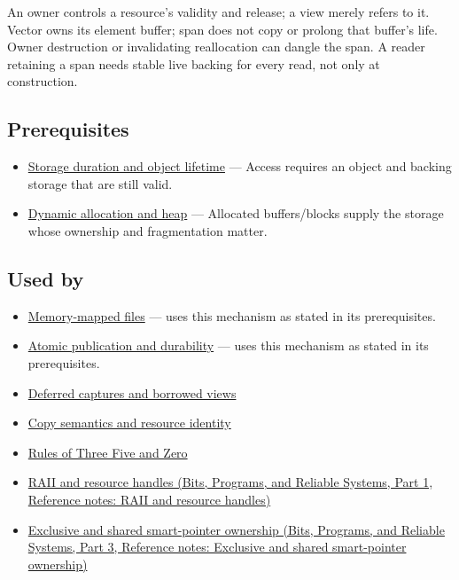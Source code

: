 An owner controls a resource's validity and release; a view merely refers to it. Vector owns its element buffer; span does not copy or prolong that buffer's life. Owner destruction or invalidating reallocation can dangle the span. A reader retaining a span needs stable live backing for every read, not only at construction.

\subsection{Prerequisites}\label{appendix-d52e4486f527-prerequisites}

\hypertarget{appendix-d52e4486f527-prerequisites}{}

\begin{itemize}
\tightlist
\item
  \hyperref[appendix-0b104bcba06b]{Storage duration and object lifetime} --- Access requires an object and backing storage that are still valid.
\item
  \hyperref[appendix-c3480f7d9ff3]{Dynamic allocation and heap} --- Allocated buffers/blocks supply the storage whose ownership and fragmentation matter.
\end{itemize}

\subsection{Used by}\label{appendix-d52e4486f527-used-by}

\hypertarget{appendix-d52e4486f527-used-by}{}

\begin{itemize}
\tightlist
\item
  \hyperref[appendix-313ee7a0ba7b]{Memory-mapped files} --- uses this mechanism as stated in its prerequisites.
\item
  \hyperref[appendix-e89a8f290ef5]{Atomic publication and durability} --- uses this mechanism as stated in its prerequisites.
\item
  \hyperref[appendix-aea529eb5175]{Deferred captures and borrowed views}
\item
  \hyperref[appendix-1340cd1ce582]{Copy semantics and resource identity}
\item
  \hyperref[appendix-7679107d057e]{Rules of Three Five and Zero}
\item
  \href{../01-Bits-Programs-and-Reliable-Systems-P01/main.pdf\#nameddest=appendix-69739d3ab49b}{RAII and resource handles (Bits, Programs, and Reliable Systems, Part 1, Reference notes: RAII and resource handles)}
\item
  \href{../01-Bits-Programs-and-Reliable-Systems-P03/main.pdf\#nameddest=appendix-51602cabe815}{Exclusive and shared smart-pointer ownership (Bits, Programs, and Reliable Systems, Part 3, Reference notes: Exclusive and shared smart-pointer ownership)}
\end{itemize}

